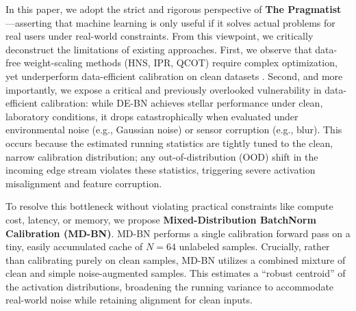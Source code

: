 \documentclass{article}
\theoremstyle{plain}
\theoremstyle{definition}
\theoremstyle{remark}
\begin{document}
In this paper, we adopt the strict and rigorous perspective of \textbf{The Pragmatist}---asserting that machine learning is only useful if it solves actual problems for real users under real-world constraints. From this viewpoint, we critically deconstruct the limitations of existing approaches. First, we observe that data-free weight-scaling methods (HNS, IPR, QCOT) require complex optimization, yet underperform data-efficient calibration on clean datasets \cite{anonymous2026b}. Second, and more importantly, we expose a critical and previously overlooked vulnerability in data-efficient calibration: while DE-BN achieves stellar performance under clean, laboratory conditions, it drops catastrophically when evaluated under environmental noise (e.g., Gaussian noise) or sensor corruption (e.g., blur). This occurs because the estimated running statistics are tightly tuned to the clean, narrow calibration distribution; any out-of-distribution (OOD) shift in the incoming edge stream violates these statistics, triggering severe activation misalignment and feature corruption.

To resolve this bottleneck without violating practical constraints like compute cost, latency, or memory, we propose \textbf{Mixed-Distribution BatchNorm Calibration (MD-BN)}. MD-BN performs a single calibration forward pass on a tiny, easily accumulated cache of $N=64$ unlabeled samples. Crucially, rather than calibrating purely on clean samples, MD-BN utilizes a combined mixture of clean and simple noise-augmented samples. This estimates a ``robust centroid'' of the activation distributions, broadening the running variance to accommodate real-world noise while retaining alignment for clean inputs.
\end{document}
